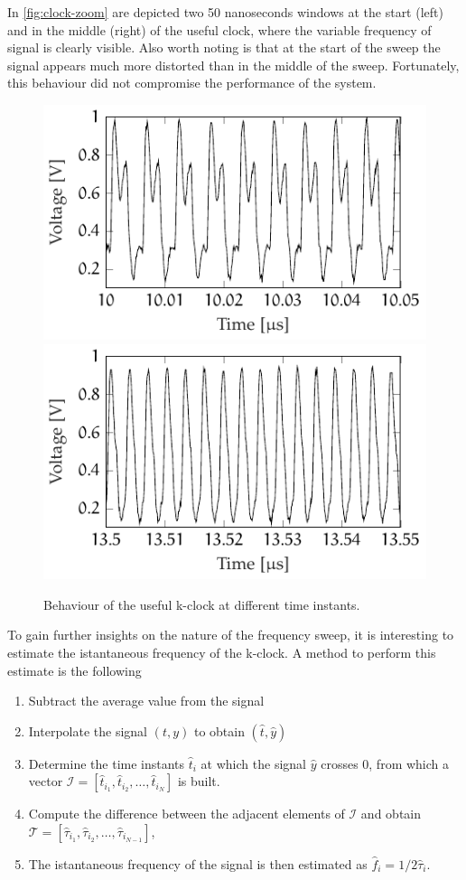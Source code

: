 In \autoref{fig:clock-zoom} are depicted two 50 nanoseconds windows at the start (left) and in the middle (right) of the useful clock, where the variable frequency of signal is clearly visible. Also worth noting is that at the start of the sweep the signal appears much more distorted than in the middle of the sweep. Fortunately, this behaviour did not compromise the performance of the system. 

\begin{figure}[bth]
	\myfloatalign
	{\includegraphics[width=.45\linewidth]{gfx/ch3/clock1}} \quad
	{\includegraphics[width=.45\linewidth]{gfx/ch3/clock2}} \\
	\caption{Behaviour of the useful k-clock at different time instants.}\label{fig:clock-zoom}
\end{figure}

To gain further insights on the nature of the frequency sweep, it is interesting to estimate the istantaneous frequency of the k-clock. A method to perform this estimate is the following
\begin{enumerate}
	\item Subtract the average value from the signal
	\item Interpolate the signal $(t, y)$ to obtain $(\hat{t}, \hat{y})$
	\item Determine the time instants $\hat{t}_i$ at which the signal $\hat{y}$ crosses 0, from which a vector $\mathcal{I} = \left[\hat{t}_{i_1}, \hat{t}_{i_2}, \dots,  \hat{t}_{i_N}\right]$ is built.
	\item Compute the difference between the adjacent elements of $\mathcal{I}$ and obtain $\mathcal{T} = \left[\hat{\tau}_{i_1}, \hat{\tau}_{i_2}, \dots,  \hat{\tau}_{i_{N-1}}\right]$,
	\item The istantaneous frequency of the signal is then estimated as $\hat{f}_i = 1/2 \hat{\tau}_i$.
\end{enumerate} 

